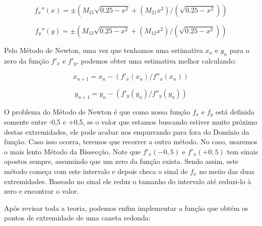 {$$
f_x''(x)= \pm (M_{21}\sqrt{0.25-x^2}+(M_{21}x^2)/(\sqrt{0.25-x^2}))
$$

$$
f_y''(y)= \pm (M_{12}\sqrt{0.25-x^2}+(M_{12}x^2)/(\sqrt{0.25-x^2}))
$$

Pelo Método de Newton, uma vez que tenhamos uma estimativa $x_n$ e
$y_n$ para o zero da função $f'_x$ e $f'_y$, podemos obter uma
estimativa melhor calculando:

$$
x_{n+1} = x_{n} - (f'_x(x_n)/f''_x(x_n))
$$

$$
y_{n+1} = y_{n} - (f'_y(y_n)/f''_y(y_n))
$$

O problema do Método de Newton é que como nossa função $f_x$ e $f_y$
está definida somente entre -0,5 e +0,5, se o valor que estamos
buscando estiver muito próximo destas extremidades, ele pode acabar
nos empurrando para fora do Domínio da função. Caso isso ocorra,
teremos que recorrer a outro método. No caso, usaremos o mais lento
Método da Bissecção. Note que $f'_x(-0,5)$ e $f'_x(+0,5)$ tem sinais
opostos sempre, assumindo que um zero da função exista. Sendo assim,
este método começa com este intervalo e depois checa o sinal de $f_x$
no meiio das duas extremidades. Baseado no sinal ele reduz o tamanho
do intervalo até reduzi-lo à zero e encontrar o valor.

Após revisar toda a teoria, podemos enfim implementar a função que
obtém os pontos de extremidade de uma caneta redonda:

}
